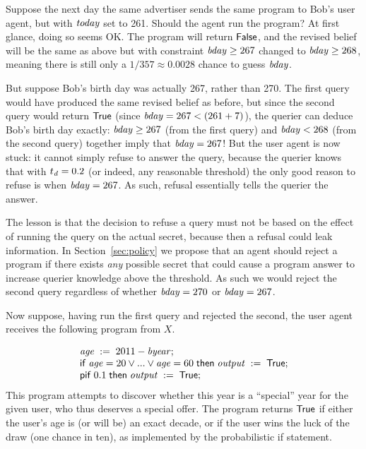 \else
Suppose the next day the same advertiser sends the same program to
Bob's user agent, but with $\mathit{today}$ set to 261.  Should the agent
run the program?  At first glance, doing so seems OK.  The program
will return $\mathsf{False}$, and the revised belief will be the same as
above but with constraint $\mathit{bday} \geq 267$ changed to $\mathit{bday}
\geq 268$, meaning there is still only a $1 / 357 \approx 0.0028$ chance to
guess $\mathit{bday}$.
\fi

But suppose Bob's birth day was actually 267, rather than 270.  The
first query would have produced the same revised belief as before, but
since the second query would return $\mathsf{True}$ (since $\mathit{bday}=267 <
(261 + 7)$), the querier can deduce Bob's birth day exactly:
$\mathit{bday} \geq 267$ (from the first query) and $\mathit{bday} < 268$
(from the second query) together imply that $\mathit{bday} = 267$!  But
the user agent is now stuck: it cannot simply refuse to answer the
query, because the querier knows that with $t_{\mathit{d}} = 0.2$ (or
indeed, any reasonable threshold) the only good reason to refuse is
when $\mathit{bday} = 267$.  As such, refusal essentially tells the
querier the answer.

The lesson is that the decision to refuse a query must not be based on
the effect of running the query on the actual secret, because then a
refusal could leak information.  In Section~\ref{sec:policy} we
propose that an agent should reject a program if there exists
\emph{any} possible secret that could cause a program answer to
increase querier knowledge above the threshold. As such we would
reject the second query regardless of whether $\mathit{bday} = 270$ or
$\mathit{bday} = 267$.

 Now suppose, having run the first
query and rejected the second, the user agent receives the following
program from $X$.
\begin{example}
\label{ex:specyear}
\begin{displaymath}
\begin{array}{l}
{\ensuremath{\mathit{age}}}\;:=\;{2011 - \mathit{byear}}; \\
\mathsf{if}\; {\mathit{age} = 20 \vee ... \vee \mathit{age} = 60}\;\mathsf{then}\;
{\mathit{output}}\;:=\;{\mathsf{True}};\\
\mathsf{pif}\;{0.1}\;\mathsf{then}\;{{\mathit{output}}\;:=\;{\mathsf{True}}};
\end{array}
\end{displaymath}
This program attempts to discover whether this year is a ``special''
year for the given user, who thus deserves a special offer.  The
program returns $\mathsf{True}$ if either the user's age is (or will be) an
exact decade, or if the user wins the luck of the draw (one chance in
ten), as implemented by the probabilistic if statement.
\end{example}

